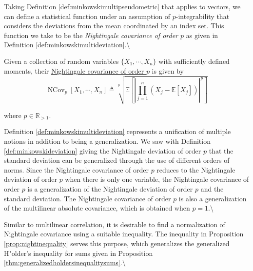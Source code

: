 \documentclass[
  letterpaper,
  DIV=11,
  numbers=noendperiod]{scrreprt}
\begin{document}
Taking Definition \ref{def:minkowskimultipseudometric} that applies to
vectors, we can define a statistical function under an assumption of
\(p\)-integrability that considers the deviations from the mean
coordinated by an index set. This function we take to be the
\textit{Nightingale covariance of order $p$} as given in Definition
\ref{def:minkowskimultideviation}.\textbackslash{}

\begin{Definition}[mydefinition=Nightingale Covariance of Order P, label=def:minkowskimultideviation]

Given a collection of random variables $\{ X_1, \cdots, X_n \}$ with sufficiently defined moments, their \underline{Nightingale covariance of order $p$} is given by 
$$\operatorname{NCov}_p \left[X_1, \cdots, X_n \right] \triangleq \sqrt[p]{ \mathbb{E} \left[ \left| \prod_{j=1}^{n} \left( X_{j} - \mathbb{E}[X_{j}] \right) \right|^p \right]}$$

where $p \in \mathbb{R}_{>1}$.
\end{Definition}

Definition \ref{def:minkowskimultideviation} represents a unification of
multiple notions in addition to being a generalization. We saw with
Definition \ref{def:minkowskideviation} giving the Nightingale deviation
of order \(p\) that the standard deviation can be generalized through
the use of different orders of norms. Since the Nightingale covariance
of order \(p\) reduces to the Nightingale deviation of order \(p\) when
there is only one variable, the Nightingale covariance of order \(p\) is
a generalization of the Nightingale deviation of order \(p\) and the
standard deviation. The Nightingale covariance of order \(p\) is also a
generalization of the multilinear absolute covariance, which is obtained
when \(p=1\).\textbackslash{}

Similar to multilinear correlation, it is desirable to find a
normalization of Nightingale covariance using a suitable inequality. The
inequality in Proposition \ref{prop:nightinequality} serves this
purpose, which generalizes the generalized H"older's inequality for sums
given in Proposition
\ref{thm:generalizedholdersinequalitysums}.\textbackslash{}
\end{document}
